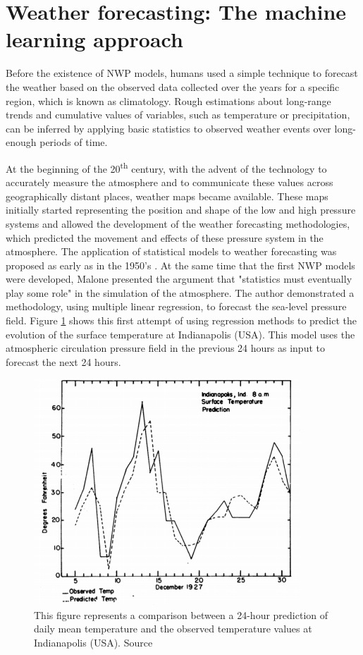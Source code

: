 \section{Weather forecasting: The machine learning approach}

Before the existence of NWP models, humans used a simple technique to forecast the weather based on the observed data collected over the years for a specific region, which is known as climatology. Rough estimations about long-range trends and cumulative values of variables, such as temperature or precipitation, can be inferred by applying basic statistics to observed weather events over long-enough periods of time.

\medskip

At the beginning of the 20\textsuperscript{th} century, with the advent of the technology to accurately measure the atmosphere and to communicate these values across geographically distant places, weather maps became available. These maps initially started representing the position and shape of the low and high pressure systems and allowed the development of the weather forecasting methodologies, which predicted the movement and effects of these pressure system in the atmosphere. The application of statistical models to weather forecasting was proposed as early as in the 1950's \citep{malone1955application}. At the same time that the first NWP models were developed, Malone presented the argument that "statistics must eventually play some role" in the simulation of the atmosphere. The author demonstrated a methodology, using multiple linear regression, to forecast the sea-level pressure field. Figure \ref{regression_meteo} shows this first attempt of using regression methods to predict the evolution of the surface temperature at Indianapolis (USA). This model uses the atmospheric circulation pressure field in the previous 24 hours as input to forecast the next 24 hours.

\medskip

\begin{figure}[h]
 \centerline{\includegraphics[width=10cm]{regression_meteo.png}} \caption{This figure represents a comparison between a 24-hour prediction of daily mean temperature and the observed temperature values at Indianapolis (USA). Source \citep{malone1955application}}\label{regression_meteo}
\end{figure}

